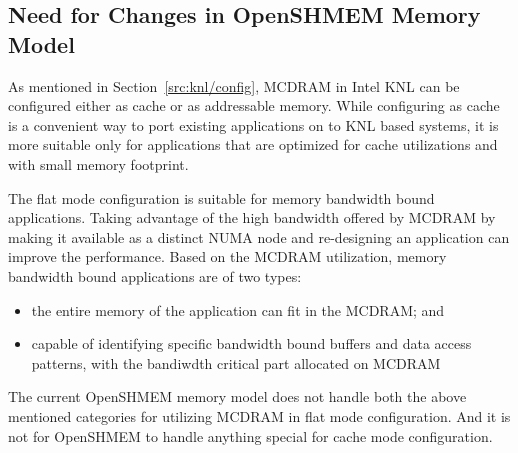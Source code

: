 
\subsection{Need for Changes in OpenSHMEM Memory Model}
\label{src:mmodel/drelated}
As mentioned in Section~\ref{src:knl/config}, MCDRAM in Intel KNL can be
configured either as cache or as addressable memory. While configuring as
cache is a convenient way to port existing applications on to KNL based
systems, it is more suitable only for applications that are optimized for
cache utilizations and with small memory footprint.

The flat mode configuration is suitable for memory bandwidth bound
applications. Taking advantage of the high bandwidth offered by MCDRAM by
making it available as a distinct NUMA node and re-designing an application
can improve the performance. Based on the MCDRAM utilization, memory
bandwidth bound applications are of two types:
\begin{itemize}
    \item the entire memory of the application can fit in the MCDRAM; and
    \item capable of identifying specific bandwidth bound buffers and data
    access patterns,
    with the bandiwdth critical part
    allocated on MCDRAM
\end{itemize}
The current OpenSHMEM memory model does not handle both the above mentioned
categories for utilizing MCDRAM in flat mode configuration. And it is not
for OpenSHMEM to handle anything special for cache mode configuration.
